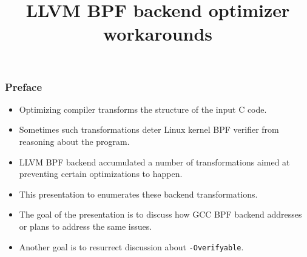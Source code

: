 \documentclass{beamer}
\title{LLVM BPF backend optimizer workarounds}
\date{}
\newcommand{\code}[1]{\texttt{#1}}
\begin{document}
\frame{\titlepage}

\begin{frame}[fragile]
\frametitle{Preface}

\begin{itemize}
\item Optimizing compiler transforms the structure of the input C code.
\item Sometimes such transformations deter Linux kernel BPF verifier
      from reasoning about the program.
\item LLVM BPF backend accumulated a number of transformations
      aimed at preventing certain optimizations to happen.
\item This presentation to enumerates these backend transformations.
\item The goal of the presentation is to discuss how GCC BPF backend
      addresses or plans to address the same issues.
\item Another goal is to resurrect discussion about \code{-Overifyable}.
\end{itemize}



\end{frame}
\end{document}
